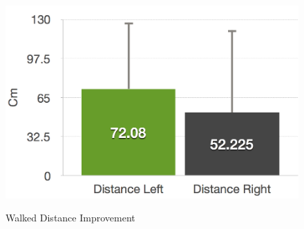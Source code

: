 \begin{figure}[htb]
		\hfill
	\begin{minipage}[t]{0.32\linewidth}
		\centering
		\includegraphics[width=1\linewidth]{Pictures/6_4_DIA_DistanceAllDiff}
		\label{fig:6_4_distanceAllDiff}
	\end{minipage}
	\caption{Walked Distance Improvement}
	\label{fig:6_4_distanceImprovement}
\end{figure}

